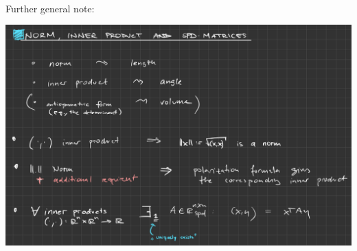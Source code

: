 \begin{enumerate}
\begin{center}
	\end{center}
	~\\Further general note:
	\begin{center}
		\includegraphics[width=0.99\linewidth]{ex-spdMatsAndNorms}
	\end{center}
	
\end{enumerate}